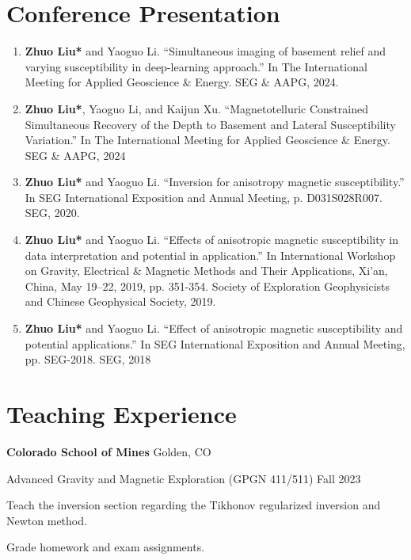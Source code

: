 \documentclass[paper=a4,fontsize=11pt]{scrartcl} %
\newcommand{\sepspace}{\vspace*{0.5em}}		%
\newcommand{\NewPart}[1]{\section*{{#1}}}
\begin{document}
\NewPart{Conference Presentation}{}
\begin{enumerate}
    \item \textbf{Zhuo Liu*}  and Yaoguo Li. “Simultaneous imaging of basement relief and varying susceptibility in deep-learning approach.” In The International Meeting for Applied Geoscience \& Energy. SEG \& AAPG, 2024.
    \item \textbf{Zhuo Liu*}, Yaoguo Li, and Kaijun Xu. “Magnetotelluric Constrained Simultaneous Recovery of the Depth to Basement and Lateral Susceptibility Variation.” In The International Meeting for Applied Geoscience \& Energy. SEG \& AAPG, 2024
    \item \textbf{Zhuo Liu*} and Yaoguo Li. “Inversion for anisotropy magnetic susceptibility.” In SEG International Exposition and Annual Meeting, p. D031S028R007. SEG, 2020.
    \item \textbf{Zhuo Liu*} and Yaoguo Li. “Effects of anisotropic magnetic susceptibility in data interpretation and potential in application.” In International Workshop on Gravity, Electrical \& Magnetic Methods and Their Applications, Xi'an, China, May 19–22, 2019, pp. 351-354. Society of Exploration Geophysicists and Chinese Geophysical Society, 2019.
    \item \textbf{Zhuo Liu*} and Yaoguo Li. “Effect of anisotropic magnetic susceptibility and potential applications.” In SEG International Exposition and Annual Meeting, pp. SEG-2018. SEG, 2018
\end{enumerate}
\sepspace




\NewPart{Teaching Experience}{}
\hspace{1em} \textbf{Colorado School of Mines} \hspace{27.5em} Golden, CO

\hspace{0em} Advanced Gravity and Magnetic Exploration (GPGN 411/511)  \hspace{12.8em} Fall 2023

\hspace{0em} \textbullet \hspace{1em} Teach the inversion section regarding the Tikhonov regularized inversion and Newton method.

\hspace{0em} \textbullet \hspace{1em} Grade homework and exam assignments.
\end{document}
